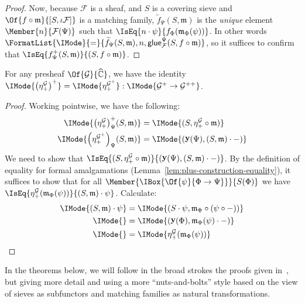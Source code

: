 \documentclass{article}
\newcommand\AIsEq[2]{\IMode{#1} &=\IMode{#2}}
\DeclareMathOperator\OpYoneda{\mathbf{y}}
\newcommand\Yoneda[1]{\OpYoneda({#1})}
\newcommand\Psh[1]{\widehat{#1}}
\newcommand\AreEq[1]{\FormatList{\IMode}{=}{#1}}
\newcommand\Plus[1]{{#1}^+}
\newcommand\PlusPlus[1]{{#1}^{++}}
\newcommand\IsEqOf[3]{\IMode{#1}=\IMode{#2}:\IMode{#3}}
\newcommand\Glue[1]{\mathsf{glue}_{#1}}
\begin{document}
\begin{proof}
  Now, because $\mathcal{F}$ is a sheaf, and $S$ is a covering sieve
  and $\Of{f\circ\mathfrak{m}}{[S,\iota\mathcal{F}]}$ is a matching family,
  $\widetilde{f}_\Psi(S,\mathfrak{m})$ is the \emph{unique} element
  $\Member{n}{\mathcal{F}(\Psi)}$ such that
  $\IsEq{n\cdot\psi}{f_\Phi(\mathfrak{m}_\Phi(\psi))}$.  In other
  words
  $\AreEq{{\widetilde{f}_\Psi(S,\mathfrak{m})}, n,
    {\Glue{\mathcal{F}}^\Psi(S,f\circ\mathfrak{m})}}$, so it suffices
  to confirm that
  $\IsEq{\Plus{f}_\Psi(S,\mathfrak{m})}{(S,f\circ\mathfrak{m})}$.
\end{proof}

\begin{lem}\label{lem:plus-eta-plus}
  For any presheaf $\Of{\mathcal{G}}{\Psh{\mathbb{C}}}$, we have the
  identity
  $\IsEqOf{\Plus{\left(\eta_+^{\mathcal{G}}\right)}}{\eta_+^{\Plus{\mathcal{G}}}}{\Plus{\mathcal{G}}\to\PlusPlus{\mathcal{G}}}$.
\end{lem}
\begin{proof}
  Working pointwise, we have the following:
  \begin{align*}
    \AIsEq{
      \Plus{\left(\eta_+^{\mathcal{G}}\right)}_\Psi(S,\mathfrak{m})
    }{
      (S,\eta_+^{\mathcal{G}}\circ\mathfrak{m})
    }
    \\
    \AIsEq{
      {\left({\eta_+^{\Plus{\mathcal{G}}}}\right)}_\Psi(S,\mathfrak{m})
    }{
      (\Yoneda{\Psi}, (S,\mathfrak{m})\cdot-)
    }
  \end{align*}
  We need to show that
  $\IsEq{(S,\eta_+^{\mathcal{G}}\circ\mathfrak{m})}{(\Yoneda{\Psi},
    (S,\mathfrak{m})\cdot-)}$. By the definition of equality for
  formal amalgamations (Lemma~\ref{lem:plus-construction-equality}),
  it suffices to show that for all
  $\Member{\IBox{\Of{\psi}{\Phi\to\Psi}}}{S(\Phi)}$ we have
  $\IsEq{\eta_+^{\mathcal{G}}(\mathfrak{m}_\Phi(\psi))}{(S,\mathfrak{m})\cdot\psi}$. Calculate:
  \begin{align*}
    \AIsEq{
      (S,\mathfrak{m})\cdot\psi
    }{
      (S\cdot\psi,\mathfrak{m}_\Phi\circ(\psi\circ-))
    }
    \\
    \AIsEq{
    }{
      (\Yoneda{\Phi},\mathfrak{m}_\Phi(\psi)\cdot-)
    }
    \\
    \AIsEq{
    }{
      \eta_+^{\mathcal{G}}(\mathfrak{m}_\Phi(\psi))
    }
  \end{align*}
\end{proof}


In the theorems below, we will follow in the broad strokes the proofs
given in~\cite{maclane-moerdijk:1992}, but giving more detail and
using a more ``nuts-and-bolts'' style based on the view of sieves as
subfunctors and matching families as natural transformations.
\end{document}
